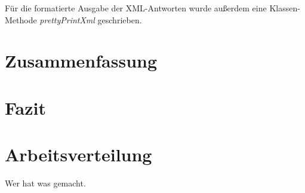 \documentclass[12pt]{scrartcl}
\begin{document}
	Für die formatierte Ausgabe der XML-Antworten wurde außerdem eine Klassen-Methode \emph{prettyPrintXml} geschrieben.
	
	
	
\section{Zusammenfassung}
\section{Fazit}
\section{Arbeitsverteilung}
Wer hat was gemacht.
\end{document}
